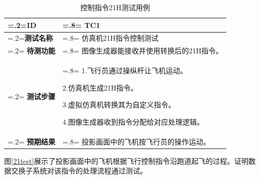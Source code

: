 \begin{table}[h!]
    \begin{center}
        \caption{控制指令21H测试用例}
        \label{testcase}
        \renewcommand\arraystretch{1.5}
        \begin{tabularx}{0.8\textwidth}{ 
             >{\centering\arraybackslash\hsize=.2\hsize\linewidth=\hsize}X 
             >{\raggedright\arraybackslash\hsize=.8\hsize\linewidth=\hsize}X 
             }
             \hline
            \textbf{ID } & \textbf{TC1}\\
             \hline
             \textbf{测试名称} & 仿真机21H指令控制测试\\
             \hline
             \textbf{待测功能} & 图像生成器能接收并使用转换后的21H指令。\\
             \hline
             \textbf{测试步骤} & 1.飞行员通过操纵杆让飞机运动。\par 2.仿真机生成21H指令。\par 3.虚拟仿真机转换其为自定义指令。\par 4.图像生成器收到指令分配给对应处理逻辑。  \\
             \hline
             \textbf{预期结果} & 投影画面中的飞机按飞行员的操作运动。\\
             \hline
            \end{tabularx}
    \end{center}
\end{table}
\par
图\ref{21test}展示了投影画面中的飞机根据飞行控制指令沿跑道起飞的过程。证明数据交换子系统对该指令的处理流程通过测试。

